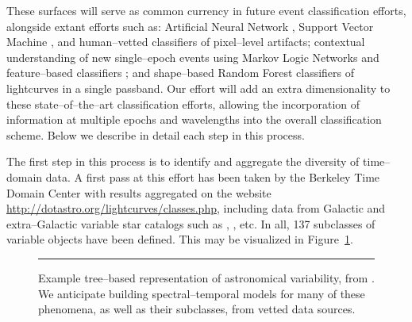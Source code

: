 These surfaces will serve as common currency in future event classification
efforts, alongside extant efforts such as: Artificial Neural Network
\citep{2008AN....329..263D}, Support Vector Machine \citep{2007ApJ...665.1246B},
and human--vetted \citep{2011arXiv1106.5491B} classifiers of pixel--level
artifacts; contextual understanding of new single--epoch events using Markov
Logic Networks \citep{2011arXiv1110.4655D} and feature--based classifiers
\citep{2011arXiv1106.5491B}; and shape--based Random Forest
\citep{2011ApJ...733...10R} classifiers of lightcurves in a single passband. Our
effort will add an extra dimensionality to these state--of--the--art
classification efforts, allowing the incorporation of information at multiple
epochs and wavelengths into the overall classification scheme.  Below we
describe in detail each step in this process.


 \smallskip

The first step in this process is to identify and aggregate the diversity of
time--domain data.  A first pass at this effort has been taken by the Berkeley
Time Domain Center with results aggregated on the website \url{
http://dotastro.org/lightcurves/classes.php}, including data from Galactic and
extra--Galactic variable star catalogs such as \cite{2008yCat.2285....0B},
\cite{2001AJ....121..870M}, etc.  In all, 137 subclasses of variable objects
have been defined.  This may be visualized in Figure~\ref{fig:var}.

\begin{figure}[t]
\centerline{} \smallskip
\caption[]{\footnotesize Example tree--based representation of astronomical
variability, from \cite{2008JPhCS.118a2010E}.  We anticipate building
spectral--temporal models for many of these phenomena, as well as their
subclasses, from vetted data sources.} \medskip \hrule \label{fig:var}
\end{figure}

